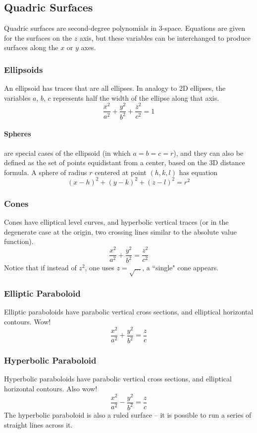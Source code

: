 \documentclass{article}
\begin{document}
\subsection{Quadric Surfaces}
Quadric surfaces are second-degree polynomials in 3-space. Equations are given for the surfaces on the $z$ axis, but these variables can be interchanged to produce surfaces along the $x$ or $y$ axes.

\subsubsection{Ellipsoids}
An ellipsoid has traces that are all ellipses. In analogy to 2D ellipses, the variables $a$, $b$, $c$ represents half the width of the ellipse along that axis.
$$\frac{x^2}{a^2} + \frac{y^2}{b^2}+\frac{z^2}{c^2}=1$$

\paragraph{Spheres} are special cases of the ellipsoid (in which $a=b=c=r$), and they can also be defined as the set of points equidistant from a center, based on the 3D distance formula. A sphere of radius $r$ centered at point $(h, k, l)$ has equation
$$(x-h)^2+(y-k)^2+(z-l)^2=r^2$$

\subsubsection{Cones}
Cones have elliptical level curves, and hyperbolic vertical traces (or in the degenerate case at the origin, two crossing lines similar to the absolute value function).
$$\frac{x^2}{a^2} + \frac{y^2}{b^2} = \frac{z^2}{c^2}$$
Notice that if instead of $z^2$, one uses $z=\sqrt{\ldots}$, a ``single" cone appears.

\subsubsection{Elliptic Paraboloid}
Elliptic paraboloids have parabolic vertical cross sections, and elliptical horizontal contours. Wow!
$$\frac{x^2}{a^2} + \frac{y^2}{b^2} = \frac{z}{c}$$

\subsubsection{Hyperbolic Paraboloid}
Hyperbolic paraboloids have parabolic vertical cross sections, and elliptical horizontal contours. Also wow!
$$\frac{x^2}{a^2} - \frac{y^2}{b^2} = \frac{z}{c}$$
The hyperbolic paraboloid is also a ruled surface -- it is possible to run a series of straight lines across it.
\end{document}
